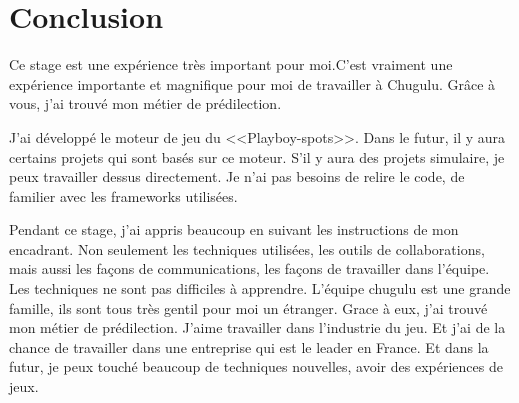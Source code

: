 \chapter{Conclusion}

Ce stage est une expérience très important pour moi.C’est vraiment une expérience importante et magnifique pour moi de travailler à Chugulu. Grâce à vous, j’ai trouvé mon métier de prédilection.

J’ai développé le moteur de jeu du <<Playboy-spots>>. Dans le futur, il y aura certains projets qui sont basés sur ce moteur. S'il y aura des projets simulaire, je peux travailler dessus directement. Je n’ai pas besoins de relire le code, de familier avec les frameworks utilisées. 

Pendant ce stage, j’ai appris beaucoup en suivant les instructions de mon encadrant. Non seulement les techniques utilisées, les outils de collaborations, mais aussi les façons de communications, les façons de travailler dans l’équipe.  Les techniques ne sont pas difficiles à apprendre. L’équipe chugulu est une grande famille, ils sont tous très gentil pour moi un étranger. Grace à eux, j’ai trouvé mon métier de prédilection. J’aime travailler dans l’industrie du jeu. Et j’ai de la chance de travailler dans une entreprise qui est le leader en France. Et dans la futur, je peux touché beaucoup de techniques nouvelles, avoir des expériences de jeux.

